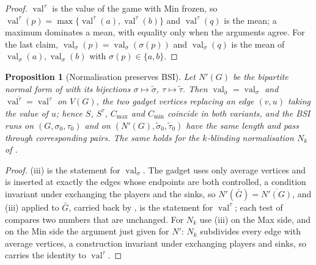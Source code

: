 \documentclass[11pt]{article}
\theoremstyle{plain}
\newtheorem{proposition}[theorem]{Proposition}
\theoremstyle{definition}
\DeclareMathOperator{\val}{val}
\begin{document}
\begin{proof}
$\val^{\tau}$ is the value of the game with Min frozen, so
$\val^{\tau}(p)=\max\{\val^{\tau}(a),\val^{\tau}(b)\}$ and
$\val^{\tau}(q)$ is the mean; a maximum dominates a mean, with equality
only when the arguments agree. For the last claim,
$\val_\sigma(p)=\val_\sigma(\sigma(p))$ and $\val_\sigma(q)$ is the mean
of $\val_\sigma(a),\val_\sigma(b)$ with $\sigma(p)\in\{a,b\}$.
\end{proof}

\begin{proposition}[Normalisation preserves BSI]\label{prop:bsi-normal}
Let $N'(G)$ be the bipartite normal form of  with its
bijections $\sigma\mapsto\tilde\sigma$, $\tau\mapsto\tilde\tau$. Then
$\val_{\tilde\sigma}=\val_\sigma$ and $\val^{\tilde\tau}=\val^{\tau}$ on
$V(G)$, the two gadget vertices replacing an edge $(v,u)$ taking the value
of $u$; hence $S$, $S^{\tau}$, $C_{\max}$ and $C_{\min}$ coincide in both
variants, and the BSI runs on $(G,\sigma_0,\tau_0)$ and on
$(N'(G),\tilde\sigma_0,\tilde\tau_0)$ have the same length and pass through
corresponding pairs. The same holds for the $k$-blinding normalisation
$N_k$ of .
\end{proposition}

\begin{proof}
(iii) is the statement for $\val_\sigma$. The gadget
uses only average vertices and is inserted at exactly the edges whose
endpoints are both controlled, a condition invariant under exchanging the
players and the sinks, so $N'(\bar G)=\overline{N'(G)}$, and
(iii) applied to $\bar G$, carried back by
, is the statement for $\val^{\tau}$; each test of
 compares two numbers that are unchanged. For $N_k$ use
(iii) on the Max side, and on the Min side the argument
just given for $N'$: $N_k$ subdivides every edge with average vertices, a
construction invariant under exchanging players and sinks, so
 carries the identity to $\val^{\tau}$.
\end{proof}
\end{document}
